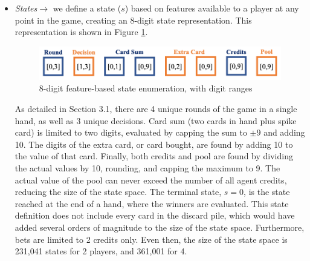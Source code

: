 \documentclass{article}
\begin{document}
\begin{itemize}
    \item \textit{States}$\rightarrow$ we define a state ($s$) based on features available to a player at any point in the game, creating an 8-digit state representation. This representation is shown in Figure \ref{fig:state_digits}.
    \begin{figure}[H]
    \centering
        \includegraphics[width=.6\textwidth]{report/figures/state.png}
        \caption{8-digit feature-based state enumeration, with digit ranges}
        \label{fig:state_digits}
    \end{figure}
    As detailed in Section 3.1, there are 4 unique rounds of the game in a single hand, as well as 3 unique decisions. Card sum (two cards in hand plus spike card) is limited to two digits, evaluated by capping the sum to $\pm 9$ and adding 10. The digits of the extra card, or card bought, are found by adding 10 to the value of that card. Finally, both credits and pool are found by dividing the actual values by 10, rounding, and capping the maximum to 9. The actual value of the pool can never exceed the number of all agent credits, reducing the size of the state space. The terminal state, $s=0$, is the state reached at the end of a hand, where the winners are evaluated. This state definition does not include every card in the discard pile, which would have added several orders of magnitude to the size of the state space. Furthermore, bets are limited to 2 credits only. Even then, the size of the state space is 231,041 states for 2 players, and 361,001 for 4.  


\end{itemize}
\end{document}
